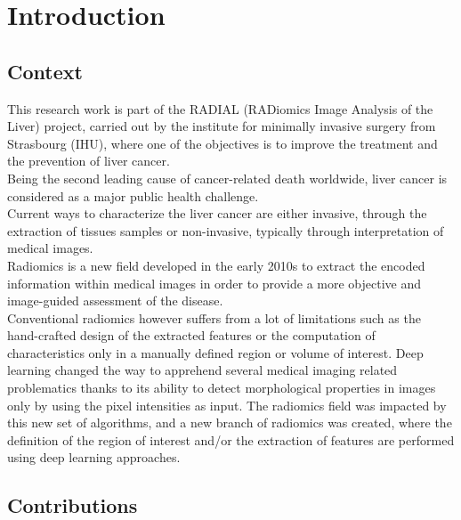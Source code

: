 \chapter*{Introduction}
\label{cha:Introduction}

\section*{Context}
\label{sec:Context}

This research work is part of the RADIAL (RADiomics Image Analysis of the Liver) project, carried out by the
institute for minimally invasive surgery from Strasbourg (IHU), where
one of the objectives is to improve the treatment and the prevention of
liver cancer.\\
Being the second leading cause of cancer-related death worldwide, liver
cancer is considered as a major public health challenge.\\
Current ways to characterize the liver cancer are either invasive, 
through the extraction of tissues samples or non-invasive, typically 
through interpretation of medical images.\\
Radiomics is a new field developed in the early 2010s to extract the encoded information within medical images in order to provide a more objective and image-guided assessment of the disease.\\
Conventional radiomics however suffers from a lot of limitations such as the hand-crafted design of the extracted features or the computation of characteristics only in a manually defined region or volume of interest. Deep learning changed the way to apprehend several medical imaging related problematics thanks to its ability to detect
morphological properties in images only by using the pixel intensities
as input. The radiomics field was impacted by this new set of algorithms, and a new branch of radiomics was created, where the definition of the region of interest and/or the extraction of features are performed using deep learning approaches.

\section*{Contributions}
\label{sec:IntroContributions}

